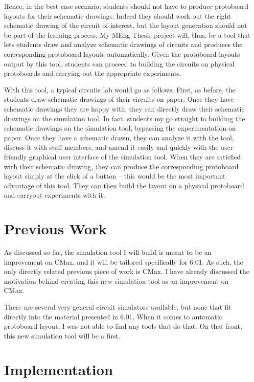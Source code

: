\documentclass[12pt, doublespacing]{amsart}
\begin{document}
Hence, in the best case scenario, students should not have to produce protoboard layouts for their schematic drawings. Indeed they should work out the right schematic drawing of the circuit of interest, but the layout generation should not be part of the learning process. My MEng Thesis project will, thus, be a tool that lets students draw and analyze schematic drawings of circuits and produces the corresponding protoboard layouts automatically. Given the protoboard layouts output by this tool, students can proceed to building the circuits on physical protoboards and carrying out the appropriate experiments.

With this tool, a typical circuits lab would go as follows. First, as before, the students draw schematic drawings of their circuits on paper. Once they have schematic drawings they are happy with, they can directly draw their schematic drawings on the simulation tool. In fact, students my go straight to building the schematic drawings on the simulation tool, bypassing the experimentation on paper. Once they have a schematic drawn, they can analyze it with the tool, discuss it with staff members, and amend it easily and quickly with the user-friendly graphical user interface of the simulation tool. When they are satisfied with their schematic drawing, they can produce the corresponding protoboard layout simply at the click of a button -- this would be the most important advantage of this tool. They can then build the layout on a physical protoboard and carryout experiments with it.

\section{Previous Work}
\label{sec:previouswork}

As discussed so far, the simulation tool I will build is meant to be an improvement on CMax, and it will be tailored specifically for 6.01. As such, the only directly related previous piece of work is CMax. I have already discussed the motivation behind creating this new simulation tool as an improvement on CMax.

There are several very general circuit simulators available, but none that fit directly into the material presented in 6.01. When it comes to automatic protoboard layout, I was not able to find any tools that do that. On that front, this new simulation tool will be a first.

\section{Implementation}
\label{sec:implementation}
\end{document}
